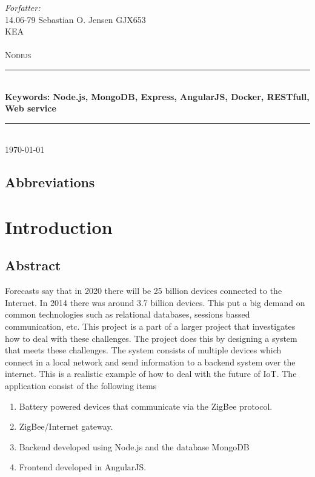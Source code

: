 \documentclass[a4paper,12pt,english]{article}
\begin{document}
\begin{titlepage}

\newcommand{\HRule}{\rule{\linewidth}{0.4mm}}
\center
\small{ \emph{Forfatter:}\\
14.06-79 Sebastian O. Jensen \textsc{GJX653}
} \\[2cm]

\textsc{\LARGE KEA}\\[0.5cm]
\textsc{\large}\\[1.5cm]
\textsc{\huge Nodejs}\\
\HRule \\[0.7cm]
{\bfseries Keywords: Node.js, MongoDB, Express, AngularJS, Docker,
RESTfull, Web service}\\[0.4cm]
\HRule
\\[1.5cm] \textsc{\Large \textsc{\today}}\\[0.5cm]

\end{titlepage}
\tableofcontents


\clearpage
\subsection{Abbreviations}
\renewcommand{\nomname}{}
\renewcommand{\pagedeclaration}[1]{}

\printnomenclature[3cm]
\clearpage
\section{Introduction}
\subsection{Abstract}
Forecasts say that in 2020 there will be 25 billion devices connected to the
Internet. In 2014 there was around 3.7 billion devices\cite{Gartner}.
This put a big demand on common technologies such as relational
databases, sessions bassed communication, etc. This project
is a part of a larger project that investigates how to deal with
these challenges. The project does this by designing a system that
meets these challenges. The system consists of multiple devices which connect
in a local network and send information to a backend system over the internet.
This is a realistic example of how to deal with the future of
IoT. The application consist of the
following items
\begin{enumerate}
  \item Battery powered devices that communicate via the ZigBee protocol.
  \item ZigBee/Internet gateway.
  \item Backend developed using Node.js and the database MongoDB
  \item Frontend developed in AngularJS.
\end{enumerate}
\end{document}
